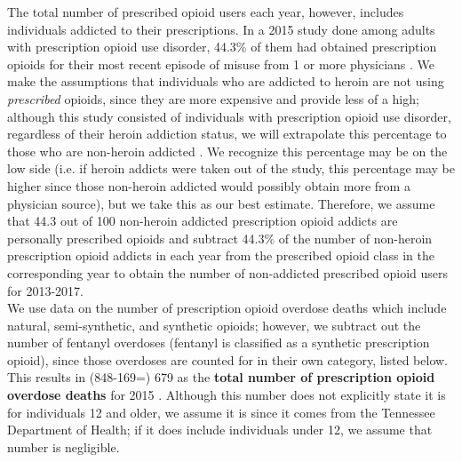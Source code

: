 \documentclass[12pt]{article}
\begin{document}

The total number of prescribed opioid users each year, however, includes individuals addicted to their prescriptions. In a 2015 study done among adults with prescription opioid use disorder, 44.3\% of them had obtained prescription opioids for their most recent episode of misuse from 1 or more physicians \cite{Han}. We make the assumptions that individuals who are addicted to heroin are not using \textit{prescribed} opioids, since they are more expensive and provide less of a high; although this study consisted of individuals with prescription opioid use disorder, regardless of their heroin addiction status, we will extrapolate this percentage to those who are non-heroin addicted \cite{NIDA1}. We recognize this percentage may be on the low side (i.e. if heroin addicts were taken out of the study, this percentage may be higher since those non-heroin addicted would possibly obtain more from a physician source), but we take this as our best estimate. Therefore, we assume that 44.3 out of 100 non-heroin addicted prescription opioid addicts are personally prescribed opioids and subtract 44.3\% of the number of non-heroin prescription opioid addicts in each year from the prescribed opioid class in the corresponding year to obtain the number of non-addicted prescribed opioid users for 2013-2017.  \\


We use data on the number of prescription opioid overdose deaths which include natural, semi-synthetic, and synthetic opioids; however, we subtract out the number of fentanyl overdoses (fentanyl is classified as a synthetic prescription opioid), since those overdoses are counted for in their own category, listed below. This results in (848-169=) 679 as the \textbf{total number of prescription opioid overdose deaths} for 2015 \cite{PDO}. Although this number does not explicitly state it is for individuals 12 and older, we assume it is since it comes from the Tennessee Department of Health; if it does include individuals under 12, we assume that number is negligible. \\
\end{document}
